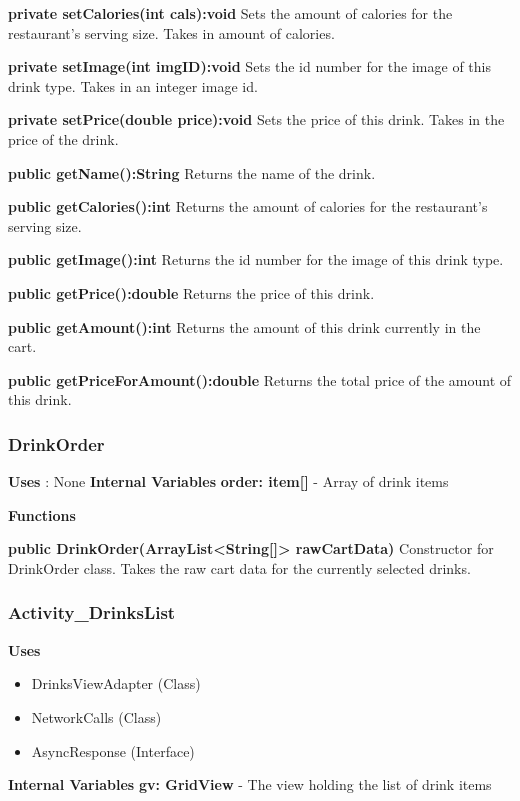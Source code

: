 \documentclass [10pt]{article}
\begin{document}
\textbf{private setCalories(int cals):void}
Sets the amount of calories for the restaurant’s serving size. Takes in amount of calories.

\textbf{private setImage(int imgID):void}
Sets the id number for the image of this drink type. Takes in an integer image id.

\textbf{private setPrice(double price):void}
Sets the price of this drink. Takes in the price of the drink.

\textbf{public getName():String}
Returns the name of the drink.

\textbf{public getCalories():int}
Returns the amount of calories for the restaurant’s serving size.

\textbf{public getImage():int}
Returns the id number for the image of this drink type.

\textbf{public getPrice():double}
Returns the price of this drink.

\textbf{public getAmount():int}
Returns the amount of this drink currently in the cart.

\textbf{public getPriceForAmount():double}
Returns the total price of the amount of this drink.

\subsubsection{DrinkOrder}
\textbf{Uses} : None
\textbf{Internal Variables}
\textbf{order: item[]} - Array of drink items

\textbf{Functions}

\textbf{public DrinkOrder(ArrayList<String[]> rawCartData)}
Constructor for DrinkOrder class. Takes the raw cart data for the currently selected drinks.

\subsubsection{Activity\_DrinksList}

\textbf{Uses}

\begin{itemize}
	\item DrinksViewAdapter (Class)
	\item NetworkCalls (Class)
	\item AsyncResponse (Interface)
\end{itemize}

\textbf{Internal Variables}
\textbf{gv: GridView} - The view holding the list of drink items
\end{document}
